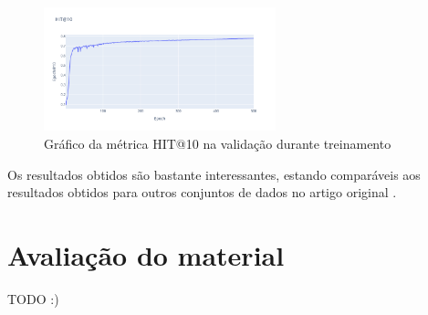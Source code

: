 \begin{figure}[H]
  \centering
  \includegraphics[width=0.6\textwidth]{../assets/validation-hit.png}
  \caption{Gráfico da métrica HIT@10 na validação durante treinamento}
\end{figure}

Os resultados obtidos são bastante interessantes, estando comparáveis
aos resultados obtidos para outros conjuntos de dados no artigo original
\cite{srssbrs}.

\section*{Avaliação do material}

TODO :)
